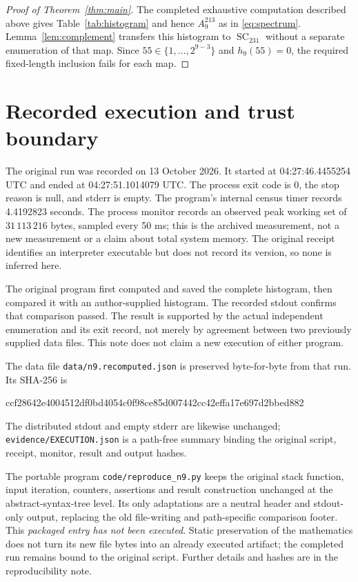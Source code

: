 \documentclass[11pt,a4paper]{article}
\newcommand{\SC}{\operatorname{SC}}
\begin{document}
\begin{proof}[Proof of Theorem~\ref{thm:main}]
The completed exhaustive computation described above gives
Table~\ref{tab:histogram} and hence $A_9^{213}$ as in
\eqref{eq:spectrum}. Lemma~\ref{lem:complement} transfers this
histogram to $\SC_{231}$ without a separate enumeration of that map.
Since $55\in\{1,\ldots,2^{9-3}\}$ and $h_9(55)=0$, the required
fixed-length inclusion fails for each map.
\end{proof}

\section{Recorded execution and trust boundary}
The original run was recorded on 13 October 2026. It started at
04:27:46.4455254 UTC and ended at 04:27:51.1014079 UTC.
The process exit code is $0$,
the stop reason is null, and stderr is empty. The program's internal
census timer records 4.4192823 seconds. The process monitor records
an observed peak working set of $31\,113\,216$ bytes, sampled every 50 ms;
this is the archived measurement, not a new measurement or a claim
about total system memory. The original receipt identifies an
interpreter executable but does not record its version, so none is
inferred here.

The original program first computed and saved the complete histogram,
then compared it with an author-supplied histogram. The recorded
stdout confirms that comparison passed. The result is supported by
the actual independent enumeration and its exit record, not merely
by agreement between two previously supplied data files. This note
does not claim a new execution of either program.

The data file \texttt{data/n9.recomputed.json} is preserved byte-for-byte
from that run. Its SHA-256 is
\begin{center}\small\ttfamily
ccf28642e4004512df0bd4054c0f98ce85d007442cc42effa17e697d2bbed882
\end{center}
The distributed stdout and empty stderr are likewise unchanged;
\texttt{evidence/EXECUTION.json} is a path-free summary binding the
original script, receipt, monitor, result and output hashes.

The portable program \texttt{code/reproduce\_n9.py} keeps the original
stack function, input iteration, counters, assertions and result
construction unchanged at the abstract-syntax-tree level. Its only
adaptations are a neutral header and stdout-only output, replacing
the old file-writing and path-specific comparison footer. This
\emph{packaged entry has not been executed}. Static preservation of
the mathematics does not turn its new file bytes into an already
executed artifact; the completed run remains bound to the original
script. Further details and hashes are in the reproducibility note.
\end{document}
